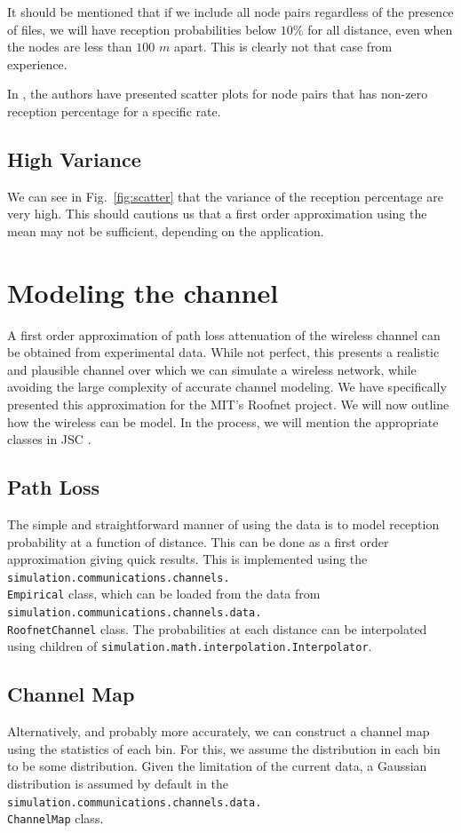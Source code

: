 \documentclass[11pt,twocolumn]{article}
\begin{document}
It should be mentioned that if we include all node pairs regardless of the presence of files, we will have reception probabilities below $10 \%$ for all distance, even when the nodes are less than $100$ $m$ apart.  This is clearly not that case from experience.

In \cite{Aguayo:2004lr}, the authors have presented scatter plots for node pairs that has non-zero reception percentage for a specific rate.

\subsection{High Variance}
We can see in Fig.~\ref{fig:scatter} that the variance of the reception percentage are very high.  This should cautions us that a first order approximation using the mean may not be sufficient, depending on the application.

\section{Modeling the channel}
A first order approximation of path loss attenuation of the wireless channel can be obtained from experimental data.  While not perfect, this presents a realistic and plausible channel over which we can simulate a wireless network, while avoiding the large complexity of accurate channel modeling.  We have specifically presented this approximation for the MIT's Roofnet project.  We will now outline how the wireless can be model.  In the process, we will mention the appropriate classes in JSC \cite{jsc}.

\subsection{Path Loss}
The simple and straightforward manner of using the data is to model reception probability at a function of distance.  This can be done as a first order approximation giving quick results.  This is implemented using the {\small\texttt{simulation.communications.channels.\\Empirical}} class, which can be loaded from the data from {\small\texttt{simulation.communications.channels.data.\\RoofnetChannel}} class.  The probabilities at each distance can be interpolated using children of {\small\texttt{simulation.math.interpolation.Interpolator}}.

\subsection{Channel Map}
Alternatively, and probably more accurately, we can construct a channel map using the statistics of each bin.  For this, we assume the distribution in each bin to be some distribution.  Given the limitation of the current data, a Gaussian distribution is assumed by default in the {\small\texttt{simulation.communications.channels.data.\\ChannelMap}} class.
\end{document}
